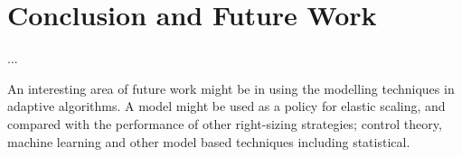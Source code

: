 %
%

\section{Conclusion and Future Work}

...

An interesting area of future work might be in using the modelling techniques in adaptive algorithms.  A model might be used as a policy for elastic scaling, and compared with the performance of other right-sizing strategies; control theory, machine learning and other model based techniques including statistical.